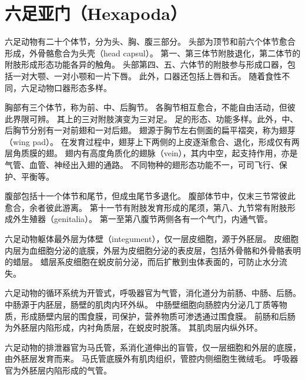 \documentclass[11pt]{article}
\begin{document}
\section{六足亚门（Hexapoda）}
六足动物有二十个体节，分为头、胸、腹三部分。
头部为顶节和前六个体节愈合形成，外骨骼愈合为头壳（head capsul）。
第一、第三体节附肢退化，第二体节的附肢形成形态功能各异的触角。
头部第四、五、六体节的附肢参与形成口器，包括一对大颚、一对小颚和一片下唇。
此外，口器还包括上唇和舌。
随着食性不同，六足动物口器形态多样。

\newline

胸部有三个体节，称为前、中、后胸节。
各胸节相互愈合，不能自由活动，但彼此界限可辨。
其上的三对附肢演变为三对足。
足的形态、功能多样。此外，中、后胸节分别有一对前翅和一对后翅。
翅源于胸节左右侧面的扁平褶突，称为翅芽（wing pad）。
在发育过程中，翅芽上下两侧的上皮逐渐愈合、退化，形成仅有两层角质膜的翅。
翅内有高度角质化的翅脉（vein），其内中空，起支持作用，亦是气管、血管、神经出入翅的通路。
不同物种的翅形态功能不一，可司飞行、保护、平衡等。

\newline

腹部包括十一个体节和尾节，但成虫尾节多退化。
腹部体节中，仅末三节常彼此愈合，余者彼此游离。
第十一节有附肢发育形成的尾须，第八、九节常有附肢形成外生殖器（genitalia）。
第一至第八腹节两侧各有一个气门，内通气管。

\newline

六足动物躯体最外层为体壁（integument），仅一层皮细胞，源于外胚层。
皮细胞内层为血细胞分泌的底膜，外层为皮细胞分泌的表皮层，包括外骨骼和外骨骼表明的蜡层。
蜡层系皮细胞在蜕皮前分泌，而后扩散到虫体表面的，可防止水分流失。

\newline

六足动物的循环系统为开管式，呼吸器官为气管，消化道分为前肠、中肠、后肠。
中肠源于内胚层，肠壁的肌肉内环外纵。
中肠壁细胞向肠腔内分泌几丁质等物质，形成肠壁内层的围食膜，司保护，营养物质可渗透通过围食膜。
前肠和后肠为外胚层内陷形成，内衬角质层，在蜕皮时脱落。
其肌肉层内纵外环。

\newline

六足动物的排泄器官为马氏管，系消化道伸出的盲管，仅一层细胞和外层的底膜，由外胚层发育而来。
马氏管底膜外有肌肉组织，管腔内侧细胞生微绒毛。
呼吸器官为外胚层内陷形成的气管。

\newline
\end{document}

